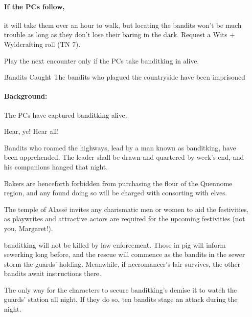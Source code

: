 \begin{multicols}{2}
\paragraph{If the PCs follow,}
it will take them over an hour to walk, but locating the bandits won't be much trouble as long as they don't lose their baring in the dark.
Request a Wits + Wyldcrafting roll (TN 7).

\banditking


Play the next encounter only if the PCs take \gls{banditking} in alive.

\resumecontents[Town]

{Bandits Caught}%
{The bandits who plagued the countryside have been imprisoned}%

\stopcontents[Town]

\paragraph{Background:}
The PCs have captured \gls{banditking} alive.

\begin{boxtext}

  Hear, ye!  Hear all!

  Bandits who roamed the highways, lead by a man known as \gls{banditking}, have been apprehended.  The leader shall be drawn and quartered by week's end, and his companions hanged that night.

  Bakers are henceforth forbidden from purchasing the flour of the Quennome region, and any found doing so will be charged with consorting with elves.

  The temple of Alass\"e invites any charismatic men or women to aid the festivities, as playwrites and attractive actors are required for the upcoming festivities (not you, Margaret!).

\end{boxtext}

\Gls{banditking} will not be killed by law enforcement.
Those in \gls{pig} will inform \gls{sewerking} long before, and the rescue will commence as the bandits in the sewer storm the guards' holding.
Meanwhile, if \gls{necromancer}'s lair survives, the other bandits await instructions there.


The only way for the characters to secure \gls{banditking}'s demise it to watch the guards' station all night.
If they do so, ten bandits stage an attack during the night.


\end{multicols}
